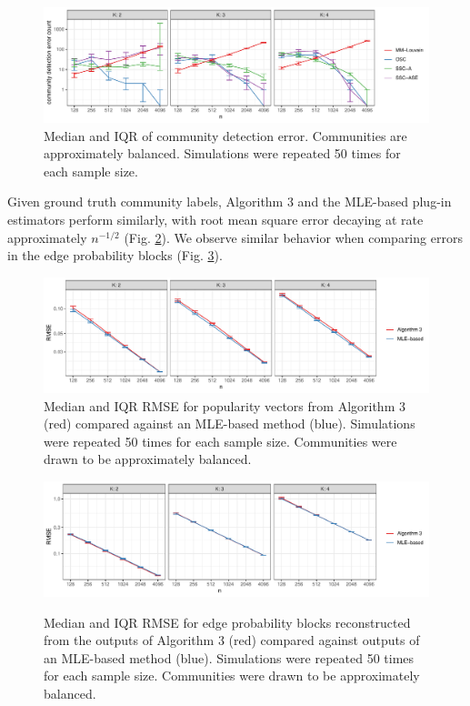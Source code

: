 \documentclass[12pt]{article}
\begin{document}
\begin{figure}[H]

{\centering \includegraphics{summary_files/figure-latex/clust_err_ct_sim-1}

}

\caption{Median and IQR of community detection error. Communities are approximately balanced. Simulations were repeated 50 times for each sample size.}\label{fig:clust_err_ct_sim}
\end{figure}

Given ground truth community labels, Algorithm 3 and the MLE-based
plug-in estimators perform similarly, with root mean square
error decaying at rate approximately \(n^{-1/2}\) (Fig. \ref{fig:lambda_est_k}). 
We observe similar behavior when comparing errors 
in the edge probability blocks (Fig. \ref{fig:p_block_est}).

\begin{figure}[H]

{\centering \includegraphics{summary_files/figure-latex/lambda_est_k-1}

}

\caption{Median and IQR RMSE for popularity vectors from Algorithm 3 (red) compared against an MLE-based method (blue). Simulations were repeated 50 times for each sample size. Communities were drawn to be approximately balanced.}
\label{fig:lambda_est_k}
\end{figure}

\begin{figure}[H]
{\centering \includegraphics{summary_files/figure-latex/lambda_est_p-1}}
\caption{Median and IQR RMSE for edge probability blocks reconstructed from the outputs of Algorithm 3 (red) compared against outputs of an MLE-based method (blue). Simulations were repeated 50 times for each sample size. Communities were drawn to be approximately balanced.}
\label{fig:p_block_est}
\end{figure}
\end{document}
